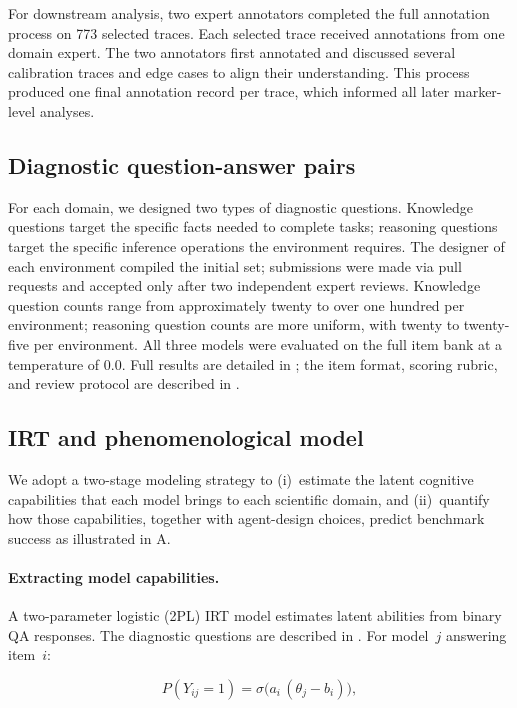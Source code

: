 For downstream analysis, two expert annotators completed the full annotation process on 773 selected traces. Each selected trace received annotations from one domain expert. The two annotators first annotated and discussed several calibration traces and edge cases to align their understanding. This process produced one final annotation record per trace, which informed all later marker-level analyses.

\subsection{Diagnostic question-answer pairs} \label{sec:qa}
For each domain, we designed two types of diagnostic questions. Knowledge questions target the specific facts needed to complete tasks; reasoning questions target the specific inference operations the environment requires. The designer of each environment compiled the initial set; submissions were made via pull requests and accepted only after two independent expert reviews. Knowledge question counts range from approximately twenty to over one hundred per environment; reasoning question counts are more uniform, with twenty to twenty-five per environment. All three models were evaluated on the full item bank at a temperature of 0.0. Full results are detailed in ; the item format, scoring rubric, and review protocol are described in .

\subsection{IRT and phenomenological model}

We adopt a two-stage modeling strategy to (i)~estimate the latent cognitive capabilities that each model brings to each scientific domain, and (ii)~quantify how those capabilities, together with agent-design choices, predict benchmark success as illustrated in  A.
  

\paragraph{Extracting model capabilities.} A two-parameter logistic (2PL) IRT model estimates latent abilities from binary QA responses. The diagnostic questions are described in .
For model~$j$ answering item~$i$:

  \begin{equation}\label{eq:irt}
    P(Y_{ij}=1) = \sigma\!\bigl(a_i\,(\theta_j - b_i)\bigr),
  \end{equation}

